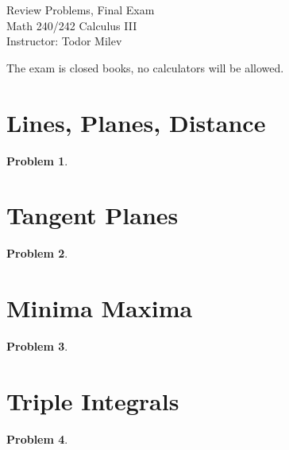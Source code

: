 \documentclass{article}
\newtheorem{problem}{Problem}
\begin{document}
\begin{center}
\Large
Review Problems, Final Exam\\ Math 240/242 Calculus III \\ \normalsize Instructor: Todor Milev
\end{center}


\noindent The exam is closed books, no calculators will be allowed. 
\section{Lines, Planes, Distance}
\begin{problem}

\end{problem}



\section{Tangent Planes}
\begin{problem}

\end{problem}


\section{Minima Maxima}
\begin{problem}

\end{problem}

\section{Triple Integrals}
\begin{problem}

\end{problem}

\end{document}
